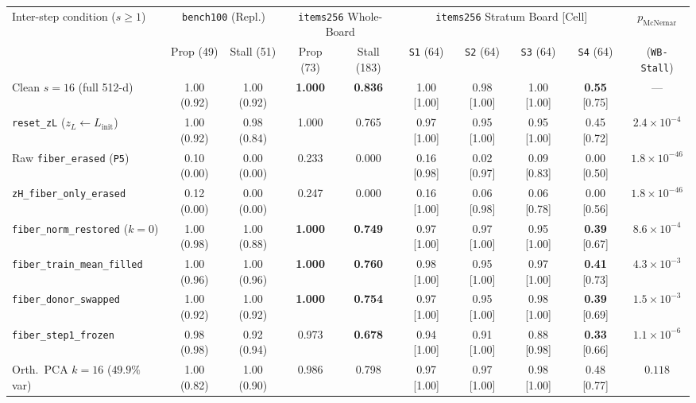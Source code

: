 \documentclass[10pt,letterpaper]{article}
\begin{document}
\begin{table}[t]
\centering
\scriptsize
\setlength{\tabcolsep}{2.3pt}
\begin{tabular}{@{}lccccccccc@{}}
\toprule
Inter-step condition ($s \ge 1$) & \multicolumn{2}{c}{\texttt{bench100} (Repl.)} & \multicolumn{2}{c}{\texttt{items256} Whole-Board} & \multicolumn{4}{c}{\texttt{items256} Stratum Board [Cell]} & $p_{\mathrm{McNemar}}$ \\
\cmidrule(lr){2-3}\cmidrule(lr){4-5}\cmidrule(lr){6-9}
 & Prop (49) & Stall (51) & Prop (73) & Stall (183) & \texttt{S1} (64) & \texttt{S2} (64) & \texttt{S3} (64) & \texttt{S4} (64) & (\texttt{WB-Stall}) \\
\midrule
Clean $s=16$ (full 512-d) & 1.00 (0.92) & 1.00 (0.92) & \textbf{1.000} & \textbf{0.836} & 1.00 [1.00] & 0.98 [1.00] & 1.00 [1.00] & \textbf{0.55} [0.75] & --- \\
\texttt{reset\_zL} ($z_L \leftarrow L_{\mathrm{init}}$) & 1.00 (0.92) & 0.98 (0.84) & 1.000 & 0.765 & 0.97 [1.00] & 0.95 [1.00] & 0.95 [1.00] & 0.45 [0.72] & $2.4\times 10^{-4}$ \\
Raw \texttt{fiber\_erased} (\texttt{P5}) & 0.10 (0.00) & 0.00 (0.00) & 0.233 & 0.000 & 0.16 [0.98] & 0.02 [0.97] & 0.09 [0.83] & 0.00 [0.50] & $1.8\times 10^{-46}$ \\
\texttt{zH\_fiber\_only\_erased} & 0.12 (0.00) & 0.00 (0.00) & 0.247 & 0.000 & 0.16 [1.00] & 0.06 [0.98] & 0.06 [0.78] & 0.00 [0.56] & $1.8\times 10^{-46}$ \\
\midrule
\texttt{fiber\_norm\_restored} ($k{=}0$) & 1.00 (0.98) & 1.00 (0.88) & \textbf{1.000} & \textbf{0.749} & 0.97 [1.00] & 0.97 [1.00] & 0.95 [1.00] & \textbf{0.39} [0.67] & $8.6\times 10^{-4}$ \\
\texttt{fiber\_train\_mean\_filled} & 1.00 (0.96) & 1.00 (0.96) & \textbf{1.000} & \textbf{0.760} & 0.98 [1.00] & 0.95 [1.00] & 0.97 [1.00] & \textbf{0.41} [0.73] & $4.3\times 10^{-3}$ \\
\texttt{fiber\_donor\_swapped} & 1.00 (0.92) & 1.00 (0.92) & \textbf{1.000} & \textbf{0.754} & 0.97 [1.00] & 0.95 [1.00] & 0.98 [1.00] & \textbf{0.39} [0.69] & $1.5\times 10^{-3}$ \\
\texttt{fiber\_step1\_frozen} & 0.98 (0.98) & 0.92 (0.94) & 0.973 & \textbf{0.678} & 0.94 [1.00] & 0.91 [1.00] & 0.88 [0.98] & \textbf{0.33} [0.66] & $1.1\times 10^{-6}$ \\
\midrule
Orth.\ PCA $k=16$ ($49.9\%$ var) & 1.00 (0.82) & 1.00 (0.90) & 0.986 & 0.798 & 0.97 [1.00] & 0.97 [1.00] & 0.98 [1.00] & 0.48 [0.77] & $0.118$ \\

\end{tabular}
\end{table}
\end{document}
